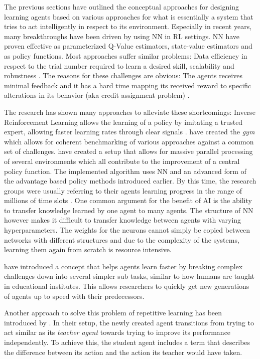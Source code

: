 The previous sections have outlined the conceptual approaches for designing learning agents based on various approaches
for what is essentially a system that tries to act intelligently in respect to its environment. Especially in recent
years, many breakthroughs have been driven by using \ac{NN} in \ac{RL} settings. \ac{NN} have proven effective as
parameterized Q-Value estimators, state-value estimators and as policy functions. Most approaches suffer similar
problems: Data efficiency in respect to the trial number required to learn a desired skill, scalability and robustness
\citep{proximalpolicyopt}. The reasons for these challenges are obvious: The agents receives minimal feedback and it has
a hard time mapping its received reward to specific alterations in its behavior (aka credit assignment problem)
\citep{arulkumaran2017brief}.

The research has shown many approaches to alleviate these shortcomings: Inverse Reinforcement Learning allows the
learning of a policy by imitating a trusted expert, allowing faster learning rates through clear signals
\citep{NG2000InvReinf}. \citet{brockman2016openai} have created the \emph{gym} which allows for coherent benchmarking of
various approaches against a common set of challenges. \citet{hafner2017agents} have created a setup that allows for
massive parallel processing of several environments which all contribute to the improvement of a central policy
function. The implemented algorithm uses \ac{NN} and an advanced form of the advantage based policy methods introduced
earlier. By this time, the research groups were usually referring to their agents learning progress in the range of
millions of time slots \citep{proximalpolicyopt}. One common argument for the benefit of \ac{AI} is the ability to
transfer knowledge learned by one agent to many agents. The structure of \ac{NN} however makes it difficult to transfer
knowledge between agents with varying hyperparameters. The weights for the neurons cannot simply be copied between
networks with different structures and due to the complexity of the systems, learning them again from scratch is
resource intensive.

\citet{matiisen2017teacher} have introduced a concept that helps agents learn faster by breaking complex challenges down
into several simpler sub tasks, similar to how humans are taught in educational institutes. This allows researchers to
quickly get new generations of agents up to speed with their predecessors.

Another approach to solve this problem of repetitive learning has been introduced by \citet{schmitt2018kickstarting}. In
their setup, the newly created agent transitions from trying to act similar as its \emph{teacher agent} towards trying
to improve its performance independently. To achieve this, the student agent includes a term that describes the
difference between its action and the action its teacher would have taken.

